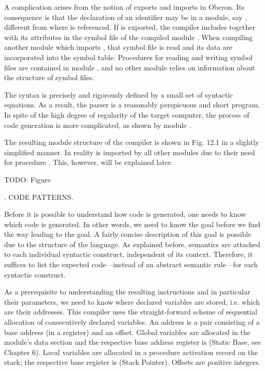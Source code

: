 A complication arises from the notion of exports and imports in Oberon. Its consequence is that the declaration of an identifier  may be in a module, say , different from where  is referenced. If  is exported, the compiler includes  together with its attributes in the symbol file of the compiled module . When compiling another module which imports , that symbol file is read and its data are incorporated into the symbol table. Procedures for reading and writing symbol files are contained in module , and no other module relies on information about the structure of symbol files.

The syntax is precisely and rigorously defined by a small set of syntactic equations. As a result, the parser is a reasonably perspicuous and short program. In spite of the high degree of regularity of the target computer, the process of code generation is more complicated, as shown by module .

The resulting module structure of the compiler is shown in Fig. 12.1 in a slightly simplified manner. In reality  is imported by all other modules due to their need for procedure . This, however, will be explained later.

TODO: Figure

. CODE PATTERNS.

Before it is possible to understand how code is generated, one needs to know which code is generated. In other words, we need to know the goal before we find the way leading to the goal. A fairly concise description of this goal is possible due to the structure of the language. As explained before, semantics are attached to each individual syntactic construct, independent of its context. Therefore, it suffices to list the expected code---instead of an abstract semantic rule---for each syntactic construct.

As a prerequisite to understanding the resulting instructions and in particular their parameters, we need to know where declared variables are stored, i.e. which are their addresses. This compiler uses the straight-forward scheme of sequential allocation of consecutively declared variables. An address is a pair consisting of a base address (in a register) and an offset. Global variables are allocated in the module's data section and the respective base address register is  (Static Base, see Chapter 6). Local variables are allocated in a procedure activation record on the stack; the respective base register is  (Stack Pointer). Offsets are positive integers.

